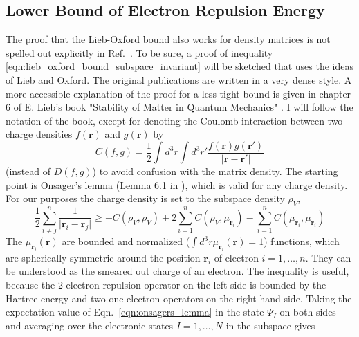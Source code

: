 \documentclass[journal=jpca,manuscript=article,layout=singlecolumn]{achemso}
\renewcommand\vec[1]{\mathbf{#1}}
\begin{document}
\subsection{Lower Bound of Electron Repulsion Energy}
\label{sec:lieb_oxford_bound_electron_repulsion}
The proof that the Lieb-Oxford bound also works for density matrices is not spelled out explicitly in Ref.~\cite{Lieb1981}. To be sure, a proof
of inequality \ref{eqn:lieb_oxford_bound_subspace_invariant} will be sketched that uses the ideas of Lieb and Oxford. The original publications
\cite{Lieb1979,Lieb1981} are written in a very dense style. A more accessible explanation of the proof
for a less tight bound is given in chapter 6 of E. Lieb's book "Stability of Matter in Quantum Mechanics" \cite{Lieb2010_Stability_of_Matter}.
I will follow the notation of the book, except for denoting the Coulomb interaction between two charge densities
$f(\vec{r})$ and $g(\vec{r})$ by 
\begin{equation}
  C(f,g) = \frac{1}{2} \int d^3r \int d^3r' \frac{f(\vec{r}) g(\vec{r}')}{\vert \vec{r} - \vec{r}' \vert}
\end{equation}
(instead of $D(f,g)$) to avoid confusion with the matrix density. The starting point is Onsager's lemma
(Lemma 6.1 in \cite{Lieb2010_Stability_of_Matter}), which is valid for any charge density. For our purposes the
charge density is set to the subspace density $\rho_V$,
\begin{equation}
\frac{1}{2} \sum_{i \neq j}^n \frac{1}{\vert \vec{r}_i - \vec{r}_j \vert}
\geq - C(\rho_V,\rho_V) + 2 \sum_{i=1}^n C(\rho_V, \mu_{\vec{r}_i}) - \sum_{i=1}^{n} C(\mu_{\vec{r}_i},\mu_{\vec{r}_i}) \label{eqn:onsagers_lemma}
\end{equation}
The $\mu_{\vec{r}_i}(\vec{r})$ are bounded and normalized ($\int d^3r \mu_{\vec{r}_i}(\vec{r}) = 1$) functions, which are
spherically symmetric around the position $\vec{r}_i$ of electron $i=1,\ldots,n$.
They can be understood as the smeared out charge of an electron. The inequality is useful, because
the 2-electron repulsion operator on the left side is bounded by the Hartree energy and two one-electron operators on the right hand side. \cite{Lieb2010_Stability_of_Matter}
Taking the expectation value of Eqn.~\ref{eqn:onsagers_lemma} in the state $\Psi_I$ on both sides and averaging over the electronic states $I=1,\ldots,N$
in the subspace gives
\end{document}

